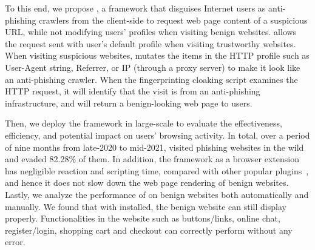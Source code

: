 To this end, we propose \spartacus, a framework that disguises Internet users as anti-phishing crawlers from the client-side to request web page content of a suspicious URL, while not modifying users' profiles when visiting benign websites.
\spartacus allows the request sent with user's default profile when visiting trustworthy websites.
When visiting suspicious websites, \spartacus mutates the items in the HTTP profile such as User-Agent string, Referrer, or IP (through a proxy server) to make it look like an anti-phishing crawler.
When the fingerprinting cloaking script examines the HTTP request, it will identify that the visit is from an anti-phishing infrastructure, and will return a benign-looking web page to users.
% 


Then, we deploy the \spartacus framework in large-scale to evaluate the effectiveness, efficiency, and potential impact on users' browsing activity.
In total, over a period of nine months from late-2020 to mid-2021, \spartacus visited \totalphishing phishing websites in the wild and evaded 82.28\% of them.
In addition, the \spartacus framework as a browser extension has negligible reaction and scripting time, compared with other popular plugins~\cite{exthouse}, and hence it does not slow down the web page rendering of benign websites.
Lastly, we analyze the performance of \spartacus on benign websites both automatically and manually.
We found that with \spartacus installed, the benign website can still display properly.
Functionalities in the website such as buttons/links, online chat, register/login, shopping cart and checkout can correctly perform without any error.

